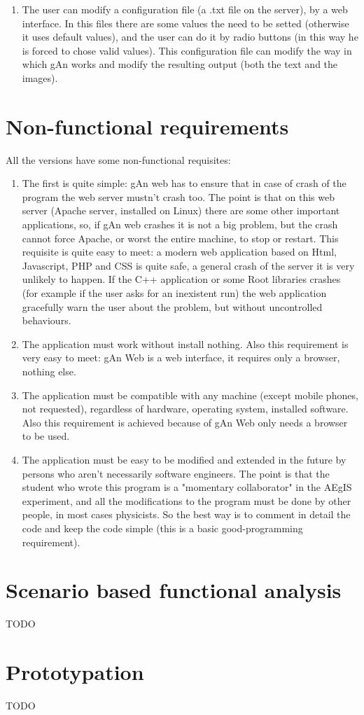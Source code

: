 \begin{enumerate}
\item The user can modify a configuration file (a .txt file on the server), by a web interface. In this files there are some values the need to be setted (otherwise it uses default values), and the user can do it by radio buttons (in this way he is forced to chose valid values). This configuration file can modify the way in which gAn works and modify the resulting output (both the text and the images).   

\end{enumerate}

 
\section{Non-functional requirements}

All the versions have some non-functional requisites:

\begin{enumerate}

\item The first is quite simple: gAn web has to ensure that in case of crash of the program the web server mustn't crash too. The point is that on this web server (Apache server, installed on Linux) there are some other important applications, so, if gAn web crashes it is not a big problem, but the crash cannot force Apache, or worst the entire machine, to stop or restart. 
This requisite is quite easy to meet: a modern web application based on Html, Javascript, PHP and CSS is quite safe, a general crash of the server it is very unlikely to happen. If the C++ application or some Root libraries crashes (for example if the user asks for an inexistent run) the web application gracefully warn the user about the problem, but without uncontrolled behaviours.  

\item The application must work without install nothing. Also this requirement is very easy to meet: gAn Web is a web interface, it requires only a browser, nothing else.

\item The application must be compatible with any machine (except mobile phones, not requested), regardless of hardware, operating system, installed software. Also this requirement is achieved because of gAn Web only needs a browser to be used. 

\item The application must be easy to be modified and extended in the future by persons who aren't necessarily software engineers. The point is that the student who wrote this program is a "momentary collaborator" in the AEgIS experiment, and all the modifications to the program must be done by other people, in most cases physicists. So the best way is to comment in detail the code and keep the code simple (this is a basic good-programming requirement).   


\end{enumerate}

\section{Scenario based functional analysis}
TODO

\section{Prototypation}
TODO 